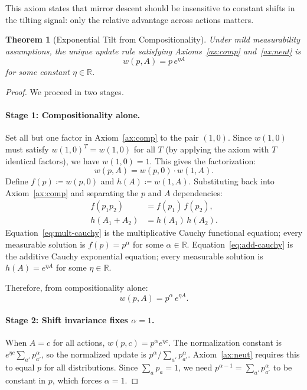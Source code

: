 \documentclass{article}
\theoremstyle{plain}
\newtheorem{theorem}{Theorem}[section]
\theoremstyle{definition}
\theoremstyle{remark}
\newcommand{\R}{\mathbb{R}}
\begin{document}
This axiom states that mirror descent should be insensitive to constant shifts in the tilting signal: only the relative advantage across actions matters.

\begin{theorem}[Exponential Tilt from Compositionality]\label{thm:main}
Under mild measurability assumptions, the unique update rule satisfying Axioms~\ref{ax:comp} and~\ref{ax:neut} is
\[
  w(p, A) = p\,e^{\eta A}
\]
for some constant $\eta \in \R$.
\end{theorem}


\begin{proof}
We proceed in two stages.

\paragraph{Stage 1: Compositionality alone.}
Set all but one factor in Axiom~\ref{ax:comp} to the pair $(1, 0)$. Since $w(1,0)$ must satisfy $w(1,0)^T = w(1,0)$ for all $T$ (by applying the axiom with $T$ identical factors), we have $w(1,0) = 1$. This gives the factorization:
\[
  w(p, A) = w(p, 0) \cdot w(1, A).
\]
Define $f(p) \coloneqq w(p, 0)$ and $h(A) \coloneqq w(1, A)$. Substituting back into Axiom~\ref{ax:comp} and separating the $p$ and $A$ dependencies:
\begin{align}
  f(p_1 p_2) &= f(p_1)\,f(p_2), \label{eq:mult-cauchy}\\
  h(A_1 + A_2) &= h(A_1)\,h(A_2). \label{eq:add-cauchy}
\end{align}
Equation~\eqref{eq:mult-cauchy} is the multiplicative Cauchy functional equation; every measurable solution is $f(p) = p^\alpha$ for some $\alpha \in \R$. Equation~\eqref{eq:add-cauchy} is the additive Cauchy exponential equation; every measurable solution is $h(A) = e^{\eta A}$ for some $\eta \in \R$.

Therefore, from compositionality alone:
\begin{equation}\label{eq:general}
  w(p, A) = p^\alpha\, e^{\eta A}.
\end{equation}

\paragraph{Stage 2: Shift invariance fixes $\alpha = 1$.}
When $A = c$ for all actions, $w(p, c) = p^\alpha e^{\eta c}$. The normalization constant is $e^{\eta c}\sum_{a'} p_{a'}^\alpha$, so the normalized update is $p^\alpha / \sum_{a'} p_{a'}^\alpha$. Axiom~\ref{ax:neut} requires this to equal $p$ for all distributions. Since $\sum_a p_a = 1$, we need $p^{\alpha - 1} = \sum_{a'} p_{a'}^\alpha$ to be constant in $p$, which forces $\alpha = 1$.
\end{proof}
\end{document}
